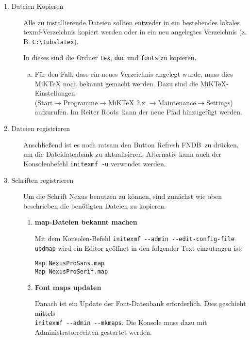 \begin{description}
  \item[1. Dateien Kopieren]
  
    Alle zu installierende Dateien sollten entweder in ein bestehendes lokales
    texmf-Verzeichnis kopiert werden oder in ein neu angelegtes Verzeichnis
    (z.\,B. \lstinline{C:\tubslatex}).
    
    In dieses sind die Ordner \lstinline{tex}, \lstinline{doc} und 
    \lstinline{fonts} zu kopieren.
    
    \begin{enumerate}[a)]
      \item {\bfseries }
        
        Für den Fall, dass ein neues Verzeichnis angelegt wurde,
        muss dies MiKTeX noch bekannt gemacht werden.
        Dazu sind die MiKTeX-Einstellungen\\ (Start$\to$Programme$\to$MiKTeX 2.x 
        $\to$Maintenance$\to$Settings) aufzurufen.
        Im Reiter \glqq Roots\grqq\ kann der neue Pfad hinzugefügt werden.
    \end{enumerate}

  \item[2. Dateien registrieren]

    Anschließend ist es noch ratsam den Button \glqq Refresh FNDB\grqq\
    zu drücken, um die Dateidatenbank zu aktualisieren. Alternativ kann auch 
    der Konsolenbefehl \lstinline{initexmf -u} verwendet werden.

  \item[3. Schriften registrieren]
    Um die Schrift Nexus benutzen zu können, sind zunächst wie oben beschrieben
    die benötigten Dateien zu kopieren.

    \begin{enumerate}

      \item {\bfseries map-Dateien bekannt machen}

      Mit dem Konsolen-Befehl \lstinline{initexmf --admin --edit-config-file updmap}
      wird ein Editor geöffnet in den folgender Text einzutragen ist:

      \begin{lstlisting}
Map NexusProSans.map
Map NexusProSerif.map
      \end{lstlisting}

      \item {\bfseries Font maps updaten}

        Danach ist ein Update der Font-Datenbank erforderlich. Dies geschieht
        mittels\\ \lstinline{initexmf --admin --mkmaps}. Die Konsole muss dazu
        mit Administratorrechten gestartet werden.


\end{enumerate}
\end{description}
